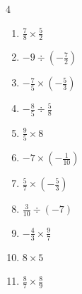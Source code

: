 \begin{multicols}{4}
\begin{enumerate}
        \phantom{$\displaystyle =10$}

\columnbreak %

\resetques

  \item $\displaystyle \frac{7}{8}\times{}\frac{5}{2}$


  \item $\displaystyle -9\div{}\left(-\frac{7}{2}\right)$


  \item $\displaystyle -\frac{7}{5}\times{}\left(-\frac{5}{3}\right)$


  \item $\displaystyle -\frac{8}{5}\div{}\frac{5}{8}$


  \item $\displaystyle \frac{9}{5}\times{}8$


  \item $\displaystyle -7\times{}\left(-\frac{1}{10}\right)$


  \item $\displaystyle \frac{5}{7}\times{}\left(-\frac{5}{3}\right)$


  \item $\displaystyle \frac{3}{10}\div{}\left(-7\right)$


  \item $\displaystyle -\frac{4}{3}\times{}\frac{9}{7}$


  \item $\displaystyle 8\times{}5$

        \phantom{$\displaystyle =40$}

\columnbreak %

  \item $\displaystyle \frac{8}{7}\times{}\frac{8}{9}$


\end{enumerate}
\end{multicols}
